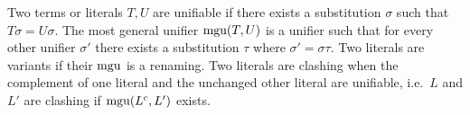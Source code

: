 
\begin{definition}\label{def:unifier}
Two terms or literals $T, U$ are {\myem unifiable} if there exists a substitution $\sigma$ such that $T\sigma=U\sigma$.
The {\myem most general unifier} $\operatorname{mgu}(T,U)$ is a unifier such that
for every other unifier $\sigma'$ there exists a substitution $\tau$ where
$\sigma' = \sigma \tau$. 
Two literals are variants if their $\operatorname{mgu}$ is a renaming.
Two literals are clashing when the complement of one literal 
and the unchanged other literal are unifiable, i.e.~$L$ and $L'$ are clashing if $\operatorname{mgu}(L^c, L')$ exists.
\end{definition}